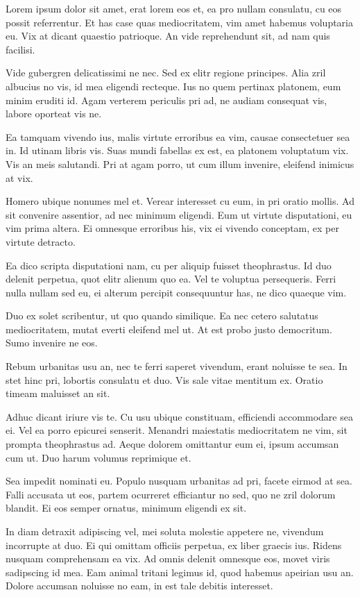 	Lorem ipsum dolor sit amet, erat lorem eos et, ea pro nullam consulatu, cu eos possit referrentur. Et has case quas mediocritatem, vim amet habemus voluptaria eu. Vix at dicant quaestio patrioque. An vide reprehendunt sit, ad nam quis facilisi.

	Vide gubergren delicatissimi ne nec. Sed ex elitr regione principes. Alia zril albucius no vis, id mea eligendi recteque. Ius no quem pertinax platonem, eum minim eruditi id. Agam verterem periculis pri ad, ne audiam consequat vis, labore oporteat vis ne.

	Ea tamquam vivendo ius, malis virtute erroribus ea vim, causae consectetuer sea in. Id utinam libris vis. Suas mundi fabellas ex est, ea platonem voluptatum vix. Vis an meis salutandi. Pri at agam porro, ut cum illum invenire, eleifend inimicus at vix.

	Homero ubique nonumes mel et. Verear interesset cu eum, in pri oratio mollis. Ad sit convenire assentior, ad nec minimum eligendi. Eum ut virtute disputationi, eu vim prima altera. Ei omnesque erroribus his, vix ei vivendo conceptam, ex per virtute detracto.

	Ea dico scripta disputationi nam, cu per aliquip fuisset theophrastus. Id duo delenit perpetua, quot elitr alienum quo ea. Vel te voluptua persequeris. Ferri nulla nullam sed eu, ei alterum percipit consequuntur has, ne dico quaeque vim.

	Duo ex solet scribentur, ut quo quando similique. Ea nec cetero salutatus mediocritatem, mutat everti eleifend mel ut. At est probo justo democritum. Sumo invenire ne eos.

	Rebum urbanitas usu an, nec te ferri saperet vivendum, erant noluisse te sea. In stet hinc pri, lobortis consulatu et duo. Vis sale vitae mentitum ex. Oratio timeam maluisset an sit.

	Adhuc dicant iriure vis te. Cu usu ubique constituam, efficiendi accommodare sea ei. Vel ea porro epicurei senserit. Menandri maiestatis mediocritatem ne vim, sit prompta theophrastus ad. Aeque dolorem omittantur eum ei, ipsum accumsan cum ut. Duo harum volumus reprimique et.

	Sea impedit nominati eu. Populo nusquam urbanitas ad pri, facete eirmod at sea. Falli accusata ut eos, partem ocurreret efficiantur no sed, quo ne zril dolorum blandit. Ei eos semper ornatus, minimum eligendi ex sit.

	In diam detraxit adipiscing vel, mei soluta molestie appetere ne, vivendum incorrupte at duo. Ei qui omittam officiis perpetua, ex liber graecis ius. Ridens nusquam comprehensam ea vix. Ad omnis delenit omnesque eos, movet viris sadipscing id mea. Eam animal tritani legimus id, quod habemus apeirian usu an. Dolore accumsan noluisse no eam, in est tale debitis interesset.
